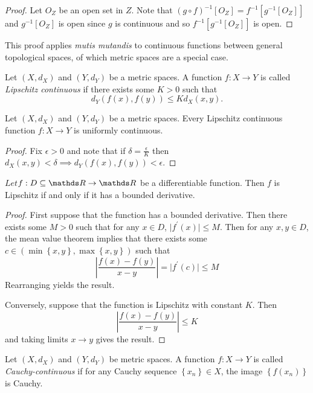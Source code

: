 \begin{proof}
Let $O_{Z}$ be an open set in $Z$. Note that $\left(g\circ f\right)^{-1}\left[O_{Z}\right]=f^{-1}\left[g^{-1}\left[O_{Z}\right]\right]$
and $g^{-1}\left[O_{Z}\right]$ is open since $g$ is continuous and
so $f^{-1}\left[g^{-1}\left[O_{Z}\right]\right]$ is open.
\end{proof}
\begin{rem*}
This proof applies \emph{mutis mutandis }to continuous functions between
general topological spaces, of which metric spaces are a special case.
\end{rem*}
\begin{defn}
\label{def:lipschitz}Let $\left(X,d_{X}\right)$ and $\left(Y,d_{Y}\right)$
be a metric spaces. A function $f:X\to Y$ is called \emph{Lipschitz
continuous }if there exists some $K>0$ such that 
\[
d_{Y}\left(f\left(x\right),f\left(y\right)\right)\leq Kd_{X}\left(x,y\right).
\]
\end{defn}

\begin{prop}
\label{prop:lipschitzContinuous}Let $\left(X,d_{X}\right)$ and $\left(Y,d_{Y}\right)$
be a metric spaces. Every Lipschitz continuous function $f:X\to Y$
is uniformly continuous.
\end{prop}

\begin{proof}
Fix $\epsilon>0$ and note that if $\delta=\frac{\epsilon}{K}$ then
$d_{X}\left(x,y\right)<\delta\implies d_{Y}\left(f\left(x\right),f\left(y\right)\right)<\epsilon.$
\end{proof}
\begin{prop}
\label{prop:lipschitzBoundedDerivative}$Let$$f:D\subseteq\R\to\R$
be a differentiable function. Then $f$ is Lipschitz if and only if
it has a bounded derivative.
\end{prop}

\begin{proof}
First suppose that the function has a bounded derivative. Then there
exists some $M>0$ such that for any $x\in D$, $\lvert f^{\prime}\left(x\right)\rvert\leq M.$
Then for any $x,y\in D$, the mean value theorem implies that there
exists some $c\in\left(\min\left\{ x,y\right\} ,\max\left\{ x,y\right\} \right)$
such that 
\[
\left\lvert \frac{f\left(x\right)-f\left(y\right)}{x-y}\right\rvert =\lvert f^{\prime}\left(c\right)\rvert\leq M
\]
Rearranging yields the result.

Conversely, suppose that the function is Lipschitz with constant $K$.
Then
\[
\left\lvert \frac{f\left(x\right)-f\left(y\right)}{x-y}\right\rvert \leq K
\]
and taking limits $x\to y$ gives the result.
\end{proof}
\begin{defn}
\label{def:cauchyContinuity}Let $\left(X,d_{X}\right)$ and $\left(Y,d_{Y}\right)$
be metric spaces. A function $f:X\to Y$ is called \emph{Cauchy-continuous
}if for any Cauchy sequence $\left\{ x_{n}\right\} \in X$, the image
$\left\{ f\left(x_{n}\right)\right\} $ is Cauchy.
\end{defn}

